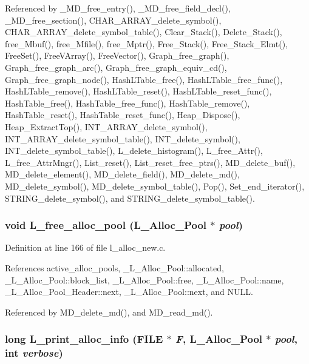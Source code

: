 Referenced by \_\-MD\_\-free\_\-entry(), \_\-MD\_\-free\_\-field\_\-decl(), \_\-MD\_\-free\_\-section(), CHAR\_\-ARRAY\_\-delete\_\-symbol(), CHAR\_\-ARRAY\_\-delete\_\-symbol\_\-table(), Clear\_\-Stack(), Delete\_\-Stack(), free\_\-Mbuf(), free\_\-Mfile(), free\_\-Mptr(), Free\_\-Stack(), Free\_\-Stack\_\-Elmt(), Free\-Set(), Free\-VArray(), Free\-Vector(), Graph\_\-free\_\-graph(), Graph\_\-free\_\-graph\_\-arc(), Graph\_\-free\_\-graph\_\-equiv\_\-cd(), Graph\_\-free\_\-graph\_\-node(), Hash\-LTable\_\-free(), Hash\-LTable\_\-free\_\-func(), Hash\-LTable\_\-remove(), Hash\-LTable\_\-reset(), Hash\-LTable\_\-reset\_\-func(), Hash\-Table\_\-free(), Hash\-Table\_\-free\_\-func(), Hash\-Table\_\-remove(), Hash\-Table\_\-reset(), Hash\-Table\_\-reset\_\-func(), Heap\_\-Dispose(), Heap\_\-Extract\-Top(), INT\_\-ARRAY\_\-delete\_\-symbol(), INT\_\-ARRAY\_\-delete\_\-symbol\_\-table(), INT\_\-delete\_\-symbol(), INT\_\-delete\_\-symbol\_\-table(), L\_\-delete\_\-histogram(), L\_\-free\_\-Attr(), L\_\-free\_\-Attr\-Mngr(), List\_\-reset(), List\_\-reset\_\-free\_\-ptrs(), MD\_\-delete\_\-buf(), MD\_\-delete\_\-element(), MD\_\-delete\_\-field(), MD\_\-delete\_\-md(), MD\_\-delete\_\-symbol(), MD\_\-delete\_\-symbol\_\-table(), Pop(), Set\_\-end\_\-iterator(), STRING\_\-delete\_\-symbol(), and STRING\_\-delete\_\-symbol\_\-table().
\subsubsection{\setlength{\rightskip}{0pt plus 5cm}void L\_\-free\_\-alloc\_\-pool (\bf{L\_\-Alloc\_\-Pool} $\ast$ {\em pool})}\label{l__alloc__new_8c_7eeadcaa1e034b7d38b34f675fad3d09}




Definition at line 166 of file l\_\-alloc\_\-new.c.

References active\_\-alloc\_\-pools, \_\-L\_\-Alloc\_\-Pool::allocated, \_\-L\_\-Alloc\_\-Pool::block\_\-list, \_\-L\_\-Alloc\_\-Pool::free, \_\-L\_\-Alloc\_\-Pool::name, \_\-L\_\-Alloc\_\-Pool\_\-Header::next, \_\-L\_\-Alloc\_\-Pool::next, and NULL.

Referenced by MD\_\-delete\_\-md(), and MD\_\-read\_\-md().
\subsubsection{\setlength{\rightskip}{0pt plus 5cm}long L\_\-print\_\-alloc\_\-info (FILE $\ast$ {\em F}, \bf{L\_\-Alloc\_\-Pool} $\ast$ {\em pool}, int {\em verbose})}\label{l__alloc__new_8c_1422cb8106c4d8f0633cc394483e0ffa}




